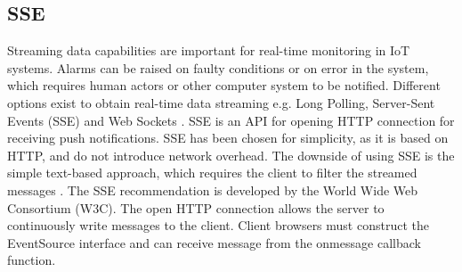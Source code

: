 \subsection{SSE}
Streaming data capabilities are important for real-time monitoring in IoT systems. Alarms can be raised on faulty conditions or on error in the system, which requires human actors or other computer system to be notified. Different options exist to obtain real-time data streaming e.g. Long Polling, Server-Sent Events (SSE) and Web Sockets \cite{evalSSE}. SSE is an API for opening HTTP connection for receiving push notifications. SSE has been chosen for simplicity, as it is based on HTTP, and do not introduce network overhead. The downside of using SSE is the simple text-based approach, which requires the client to filter the streamed messages \cite{evalSSE}. The SSE recommendation \cite{W3C} is developed by the World Wide Web Consortium (W3C). The open HTTP connection allows the server to continuously write messages to the client. Client browsers must construct the EventSource interface and can receive message from the onmessage callback function.